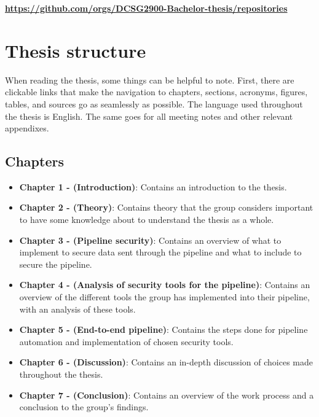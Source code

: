 \href{https://github.com/orgs/DCSG2900-Bachelor-thesis/repositories}{\textbf{https://github.com/orgs/DCSG2900-Bachelor-thesis/repositories}}

\section{Thesis structure}
When reading the thesis, some things can be helpful to note. First, there are clickable links that make the navigation to chapters, sections, acronyms, figures, tables, and sources go as seamlessly as possible. The language used throughout the thesis is English. The same goes for all meeting notes and other relevant appendixes. 


\subsection{Chapters}
\begin{itemize}
    \item \textbf{Chapter 1 - (Introduction)}: Contains an introduction to the thesis.
    \item \textbf{Chapter 2 - (Theory)}: Contains theory that the group considers important to have some knowledge about to understand the thesis as a whole.
    \item \textbf{Chapter 3 - (Pipeline security)}: Contains an overview of what to implement to secure data sent through the pipeline and what to include to secure the pipeline. 
    \item \textbf{Chapter 4 - (Analysis of security tools for the pipeline)}: Contains an overview of the different tools the group has implemented into their pipeline, with an analysis of these tools.
    \item \textbf{Chapter 5 - (End-to-end pipeline)}: Contains the steps done for pipeline automation and implementation of chosen security tools. 
    \item \textbf{Chapter 6 - (Discussion)}: Contains an in-depth discussion of choices made throughout the thesis. 
    \item \textbf{Chapter 7 - (Conclusion)}: Contains an overview of the work process and a conclusion to the group's findings. 

\end{itemize}






